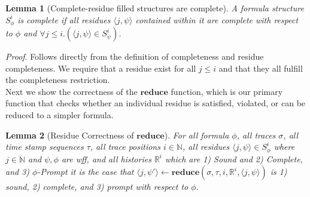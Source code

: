 \documentclass[10pt,a4paper]{article}
\newcommand{\rp}[2]{\ensuremath{\langle #1, #2 \rangle}}
\newtheorem{lemma}{Lemma}
\begin{document}
\begin{lemma}[Complete-residue filled structures are complete]
A formula structure $S^i_{\phi}$ is complete if all residues $\rp{j}{\psi}$ contained within it are complete with respect to $\phi$ and $\forall j \leq i.(\rp{j}{\psi} \in S^i_{\psi})$.
\end{lemma}

\noindent \emph{Proof}. Follows directly from the definition of completeness and residue completeness. We require that a residue exist for all $j \leq i$ and that they all fulfill the completeness restriction. \\

Next we show the correctness of the $\mathbf{reduce}$ function, which is our primary function that checks whether an individual residue is satisfied, violated, or can be reduced to a simpler formula.

%

\begin{lemma}[Residue Correctness of $\mathbf{reduce}$]
For all formula $\phi$,
all traces $\sigma$, 
all time stamp sequences $\tau$, 
all trace positions $i \in \mathbb{N}$, 
all residues $\rp{j}{\psi} \in S^i_{\phi}$ where $j \in \mathbb{N}$ and $\psi,\phi$ are wff, 
and all histories $\mathbb{R}^i$ which are 1) Sound and 2) Complete, and 3) $\phi$-Prompt 
%
it is the case that $\rp{j}{\psi'} \leftarrow \mathbf{reduce}(\sigma,\tau,i,\mathbb{R}^i, \rp{j}{\psi})$ is 1) sound, 2) complete, and 3) prompt with respect to $\phi$.
\end{lemma}
\end{document}
